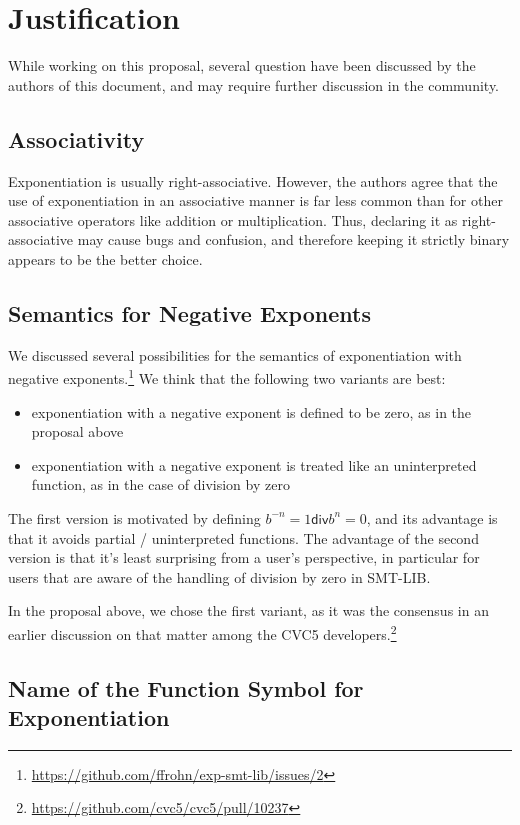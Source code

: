 \documentclass{article}
\begin{document}
\section{Justification}

While working on this proposal, several question have been discussed by the authors of this document, and may require further discussion in the community.

\subsection{Associativity}

Exponentiation is usually right-associative.
%
However, the authors agree that the use of exponentiation in an associative manner is far less common than for other associative operators like addition or multiplication.
%
Thus, declaring it as right-associative may cause bugs and confusion, and therefore keeping it strictly binary appears to be the better choice.

\subsection{Semantics for Negative Exponents}

We discussed several possibilities for the semantics of exponentiation with negative exponents.\footnote{\url{https://github.com/ffrohn/exp-smt-lib/issues/2}}
%
We think that the following two variants are best:
%
\begin{itemize}
\item exponentiation with a negative exponent is defined to be zero, as in the proposal above
\item exponentiation with a negative exponent is treated like an uninterpreted function, as in the case of division by zero
\end{itemize}
%
The first version is motivated by defining $b^{-n} = 1 \mathrel{\mathsf{div}} b^n = 0$, and its advantage is that it avoids partial / uninterpreted functions.
%
The advantage of the second version is that it's least surprising from a user's perspective, in particular for users that are aware of the handling of division by zero in SMT-LIB.

In the proposal above, we chose the first variant, as it was the consensus in an earlier discussion on that matter among the CVC5 developers.\footnote{\url{https://github.com/cvc5/cvc5/pull/10237}}

\subsection{Name of the Function Symbol for Exponentiation}
\end{document}
